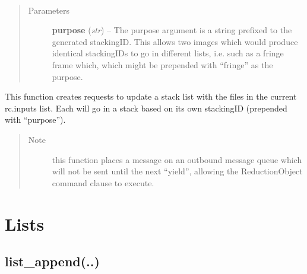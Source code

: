 \documentclass[letterpaper,10pt,english]{sphinxmanual}
\begin{document}
\begin{fulllineitems}
\label{chapter_ReductionContextClass:astrodata.RecipeManager.ReductionContext.rq_stack_update}~\begin{quote}\begin{description}
\item[{Parameters}] \leavevmode
\textbf{purpose} (\emph{str}) -- The purpose argument is a string prefixed to the
generated stackingID.  This allows two images which would
produce identical stackingIDs to go in different lists,
i.e. such as a fringe frame which, which might be prepended with
``fringe'' as the purpose.

\end{description}\end{quote}

This function creates requests to update a stack list with the files
in the current rc.inputs list.  Each will go in a stack based on its
own stackingID (prepended with ``purpose'').
\begin{quote}\begin{description}
\item[{Note }] \leavevmode
this function places a message on an outbound message queue
which will not be sent until the next ``yield'', allowing the
ReductionObject command clause to execute.

\end{description}\end{quote}

\end{fulllineitems}



\section{Lists}
\label{chapter_ReductionContextClass:lists}

\subsection{list\_append(..)}
\label{chapter_ReductionContextClass:list-append}
\end{document}
